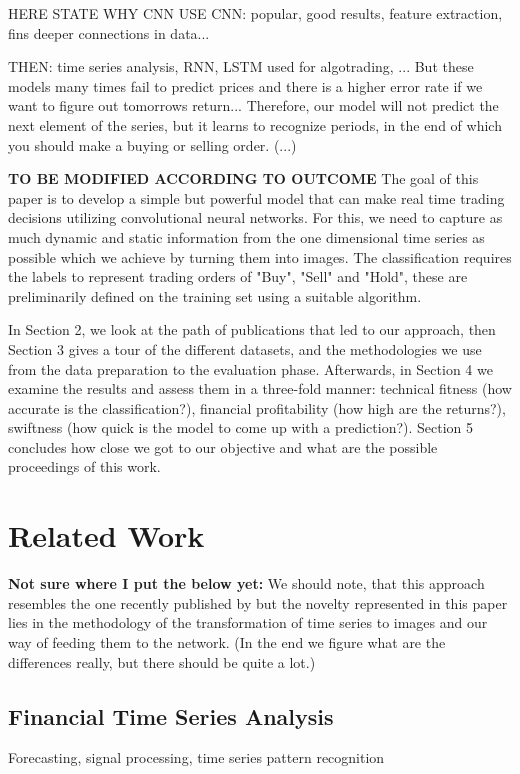 \documentclass[11pt, a4paper]{article}
\begin{document}
HERE STATE WHY CNN USE CNN: popular, good results, feature extraction, fins deeper connections in data...

THEN: time series analysis, RNN, LSTM used for algotrading, ... But these models many times fail to predict prices and there is a higher error rate if we want to figure out tomorrows return... 
Therefore, our model will not predict the next element of the series, but it learns to recognize periods, in the end of which you should make a buying or selling order. (...)


\textbf{TO BE MODIFIED ACCORDING TO OUTCOME}
The goal of this paper is to develop a simple but powerful model that can make real time trading decisions utilizing convolutional neural networks. For this, we need to capture as much dynamic 
and static information from the one dimensional time series as possible which we achieve by turning them into images. The classification requires the labels to represent trading orders of "Buy", 
"Sell" and "Hold", these are preliminarily defined on the training set using a suitable algorithm. 

In Section 2, we look at the path of publications that led to our approach, then Section 3 gives a tour of the different datasets, and the methodologies we use from the data preparation to the evaluation phase. 
Afterwards, in Section 4 we examine the results and assess them in a three-fold manner:
technical fitness (how accurate is the classification?), financial profitability (how high are the returns?), swiftness (how quick is the model to come up with a prediction?). Section 5 concludes how close we 
got to our objective and what are the possible proceedings of this work.

\section{Related Work}

\textbf{Not sure where I put the below yet:}
We should note, that this approach resembles the one recently published by \cite{sezer2018algorithmic} but the novelty represented in this paper lies in the methodology of 
the transformation of time series to images and our way of feeding them to the network. (In the end we figure what are the differences really, but there should be quite a lot.)

\subsection{Financial Time Series Analysis}
Forecasting, signal processing, time series pattern recognition
\end{document}
